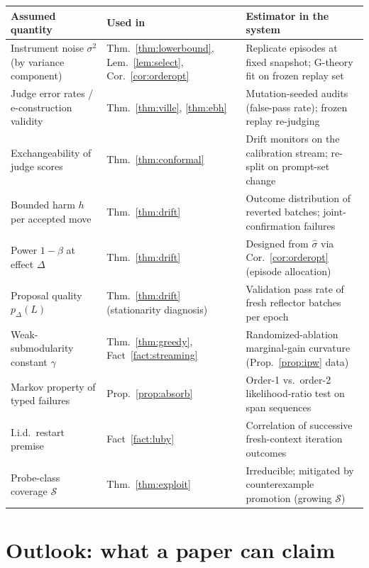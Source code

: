 \documentclass[11pt]{article}
\theoremstyle{plain}
\theoremstyle{definition}
\theoremstyle{remark}
\newcommand{\cS}{\mathcal{S}}
\begin{document}
\begin{center}
\small
\begin{tabular}{@{}p{}p{}p{}@{}}
\toprule
\textbf{Assumed quantity} & \textbf{Used in} & \textbf{Estimator in the system} \\
\midrule
Instrument noise $\sigma^2$ (by variance component) &
Thm.~\ref{thm:lowerbound}, Lem.~\ref{lem:select}, Cor.~\ref{cor:orderopt} &
Replicate episodes at fixed snapshot; G-theory fit on frozen replay set \\
\addlinespace
Judge error rates / e-construction validity &
Thm.~\ref{thm:ville}, \ref{thm:ebh} &
Mutation-seeded audits (false-pass rate); frozen replay re-judging \\
\addlinespace
Exchangeability of judge scores &
Thm.~\ref{thm:conformal} &
Drift monitors on the calibration stream; re-split on prompt-set change \\
\addlinespace
Bounded harm $h$ per accepted move &
Thm.~\ref{thm:drift} &
Outcome distribution of reverted batches; joint-confirmation failures \\
\addlinespace
Power $1-\beta$ at effect $\Delta$ &
Thm.~\ref{thm:drift} &
Designed from $\hat\sigma$ via Cor.~\ref{cor:orderopt} (episode allocation) \\
\addlinespace
Proposal quality $p_\Delta(L)$ &
Thm.~\ref{thm:drift} (stationarity diagnosis) &
Validation pass rate of fresh reflector batches per epoch \\
\addlinespace
Weak-submodularity constant $\gamma$ &
Thm.~\ref{thm:greedy}, Fact~\ref{fact:streaming} &
Randomized-ablation marginal-gain curvature (Prop.~\ref{prop:ipw} data) \\
\addlinespace
Markov property of typed failures &
Prop.~\ref{prop:absorb} &
Order-1 vs.\ order-2 likelihood-ratio test on span sequences \\
\addlinespace
I.i.d.\ restart premise &
Fact~\ref{fact:luby} &
Correlation of successive fresh-context iteration outcomes \\
\addlinespace
Probe-class coverage $\cS$ &
Thm.~\ref{thm:exploit} &
Irreducible; mitigated by counterexample promotion (growing $\cS$) \\
\bottomrule
\end{tabular}
\end{center}

\section{Outlook: what a paper can claim}\label{sec:outlook}
\end{document}
